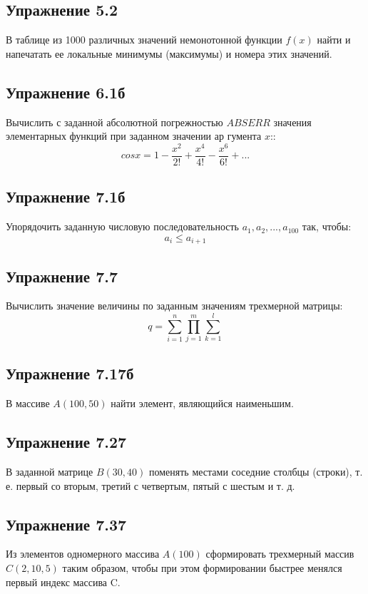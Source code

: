 \subsection{\fontsize{14pt}{16.8pt}Упражнение 5.2}
\noindent
В таблице из 1000 различных значений немонотонной функции $ f(x) $ найти и напечатать ее локальные минимумы (максимумы) и номера этих значений.

\subsection{\fontsize{14pt}{16.8pt}Упражнение 6.1б}
\noindent
Вычислить с заданной абсолютной погрежностью $ABSERR$ значения элементарных функций при заданном значении ар гумента $x$::\\[2mm]
    $$ cos x = 1 - \frac{x^2}{2!} + \frac{x^4}{4!} - \frac{x^6}{6!} + ...$$
    
\subsection{\fontsize{14pt}{16.8pt}Упражнение 7.1б}
\noindent
Упорядочить заданную числовую последовательность $a_1,a_2, ...,a_{100}$ так, чтобы:
$$a_i \leq a_{i+1}$$
\subsection{\fontsize{14pt}{16.8pt}Упражнение 7.7}
\noindent
Вычислить значение величины по заданным значениям трехмерной матрицы: $$q = \sum_{i=1}^{n} \prod_{j=1}^{m} \sum_{k=1}^{l}$$
\subsection{\fontsize{14pt}{16.8pt}Упражнение 7.17б}
\noindent
В массиве $A(100,50)$ найти элемент, являющийся наименьшим.    
\subsection{\fontsize{14pt}{16.8pt}Упражнение 7.27}
\noindent
В заданной матрице $B(30,40)$ поменять местами соседние столбцы (строки), т. е. первый со вторым, третий с четвертым, пятый с шестым и т. д.
\subsection{\fontsize{14pt}{16.8pt}Упражнение 7.37}
\noindent
Из элементов одномерного массива $A(100)$ сформировать трехмерный массив  $C(2,10,5)$ таким образом, чтобы при этом формировании быстрее менялся первый индекс массива C.

